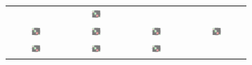 \begin{figure}
\begin{center}
\begin{subfigure}[b]{0.45\linewidth}
\begin{center}
\begin{tabular}{cccc}
   & {\includegraphics[width=0.2\textwidth,page=4]{../fig/combined.pdf}}\\
{\includegraphics[width=0.2\textwidth,page=5]{../fig/combined.pdf}} 
   & {\includegraphics[width=0.2\textwidth,page=6]{../fig/combined.pdf}}
   & {\includegraphics[width=0.2\textwidth,page=7]{../fig/combined.pdf}} 
   & {\includegraphics[width=0.2\textwidth,page=8]{../fig/combined.pdf}}\\
{\includegraphics[width=0.2\textwidth,page=9]{../fig/combined.pdf}} 
   & {\includegraphics[width=0.2\textwidth,page=10]{../fig/combined.pdf}}
   & {\includegraphics[width=0.2\textwidth,page=11]{../fig/combined.pdf}} 

\end{tabular}
\end{center}
\end{subfigure}
\end{center}
\end{figure}
